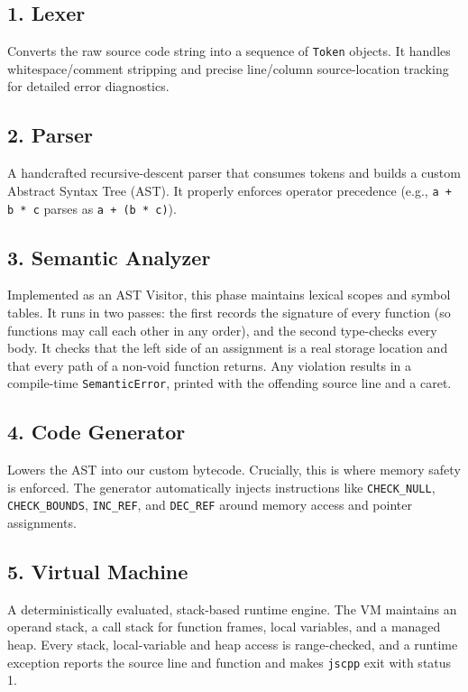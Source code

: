 \documentclass[12pt, a4paper]{article}
\begin{document}
\subsection{1. Lexer}
Converts the raw source code string into a sequence of \texttt{Token} objects. It handles whitespace/comment stripping and precise line/column source-location tracking for detailed error diagnostics.

\subsection{2. Parser}
A handcrafted recursive-descent parser that consumes tokens and builds a custom Abstract Syntax Tree (AST). It properly enforces operator precedence (e.g., \texttt{a + b * c} parses as \texttt{a + (b * c)}).

\subsection{3. Semantic Analyzer}
Implemented as an AST Visitor, this phase maintains lexical scopes and symbol tables. It runs in two passes: the first records the signature of every function (so functions may call each other in any order), and the second type-checks every body. It checks that the left side of an assignment is a real storage location and that every path of a non-void function returns. Any violation results in a compile-time \texttt{SemanticError}, printed with the offending source line and a caret.

\subsection{4. Code Generator}
Lowers the AST into our custom bytecode. Crucially, this is where memory safety is enforced. The generator automatically injects instructions like \texttt{CHECK\_NULL}, \texttt{CHECK\_BOUNDS}, \texttt{INC\_REF}, and \texttt{DEC\_REF} around memory access and pointer assignments.

\subsection{5. Virtual Machine}
A deterministically evaluated, stack-based runtime engine. The VM maintains an operand stack, a call stack for function frames, local variables, and a managed heap. Every stack, local-variable and heap access is range-checked, and a runtime exception reports the source line and function and makes \texttt{jscpp} exit with status 1.
\end{document}

